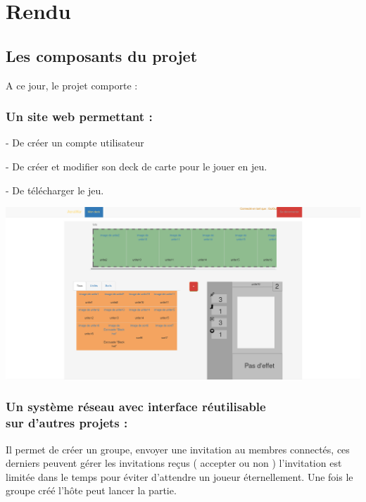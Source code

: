 \documentclass[a4paper,11pt]{report}
\begin{document}
\section{Rendu}
\subsection{Les composants du projet}
A ce jour, le projet comporte :

	\subsubsection{Un site web permettant :}
	
	 - De créer un compte utilisateur
		 
	 - De créer et modifier son deck de carte pour le jouer en jeu.
	 
	 - De télécharger le jeu.
	 
	 \begin{center}
	\includegraphics[scale=0.2]{Assets/site.png} 
	\end{center}

	
	\subsubsection{Un système réseau avec interface réutilisable\\ sur d'autres 			projets :}
	
	Il permet de créer un groupe, envoyer une invitation au membres connectés, ces derniers peuvent gérer les invitations reçus ( accepter ou non ) l'invitation est limitée dans le temps pour éviter d'attendre un joueur éternellement. Une fois le groupe créé l'hôte peut lancer la partie.   
	
\end{document}
